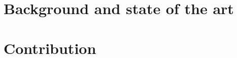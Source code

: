 \documentclass[openany,12pt,oneside]{extreport}
\begin{document}
\part{Background and state of the art}



\part{Contribution}


\clearpage
{}
{}
\printbibliography
\end{document}

